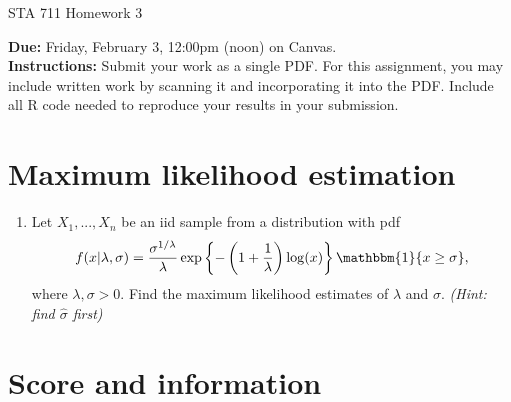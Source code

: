 \documentclass[11pt]{article}
\begin{document}
\begin{center}
\Large
STA 711 Homework 3\\
\normalsize
\vspace{5mm}
\end{center}

\noindent \textbf{Due:} Friday, February 3, 12:00pm (noon) on Canvas.\\ 

\noindent \textbf{Instructions:} Submit your work as a single PDF. For this assignment, you may include written work by scanning it and incorporating it into the PDF. Include all R code needed to reproduce your results in your submission.

\section*{Maximum likelihood estimation}

\begin{enumerate}
\item Let $X_1,...,X_n$ be an iid sample from a distribution with pdf 
$$f(x | \lambda, \sigma) = \dfrac{\sigma^{1/\lambda}}{\lambda} \exp \left\lbrace -\left(1 + \frac{1}{\lambda}\right) \log(x) \right\rbrace \mathbbm{1}\{ x \geq \sigma \},$$
where $\lambda, \sigma > 0$. Find the maximum likelihood estimates of $\lambda$ and $\sigma$. \textit{(Hint: find $\widehat{\sigma}$ first)}
\end{enumerate}

\section*{Score and information}
\end{document}
